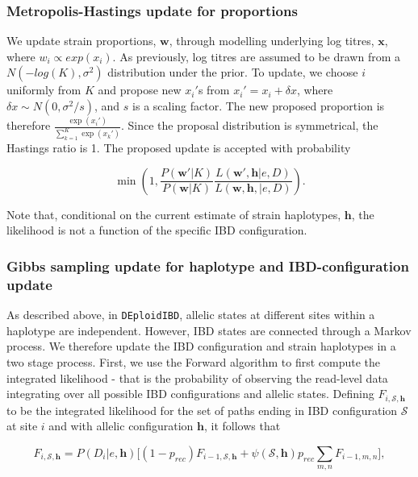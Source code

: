 \documentclass[9pt]{article}
\begin{document}
\subsubsection{Metropolis-Hastings update for proportions}\label{sec:updateP}

We update strain proportions, $\mathbf{w}$, through modelling underlying log titres, $\mathbf{x}$, where $w_i \propto exp(x_i)$.  As previously, log titres are assumed to be drawn from a $N(-log(K), \sigma^2)$ distribution under the prior. To update, we choose $i$ uniformly from $K$ and propose new $x_i'$s from $x_i' = x_i + \delta x$, where $\delta x \sim N(0, \sigma^2/s)$, and $s$ is a scaling factor. The new proposed proportion is therefore $\frac{\exp(x_i')}{\sum_{k=1}^K \exp(x_k')}$. Since the proposal distribution is symmetrical, the Hastings ratio is 1. The proposed update is accepted with probability

 $$\min\left(1, \frac{P(\mathbf{w}'|K)}{P(\mathbf{w}|K)} \frac{L(\mathbf{w}', \mathbf{h} | e, D)}{L(\mathbf{w}, \mathbf{h},  | e, D)}\right).$$

\noindent Note that, conditional on the current estimate of strain haplotypes, $\mathbf{h}$, the likelihood is not a function of the specific IBD configuration.


\subsubsection{Gibbs sampling update for haplotype and IBD-configuration update}

As described above, in {\tt DEploidIBD}, allelic states at different sites within a haplotype are independent. However, IBD states are connected through a Markov process. We therefore update the IBD configuration and strain haplotypes in a two stage process.  First, we use the Forward algorithm to first compute the integrated likelihood - that is the probability of observing the read-level data integrating over all possible IBD configurations and allelic states.  Defining $F_{i,\mathcal{S},\mathbf{h}}$ to be the integrated likelihood for the set of paths ending in IBD configuration $\mathcal{S}$ at site $i$ and with allelic configuration $\mathbf{h}$, it follows that

\begin{equation}
    F_{i,\mathcal{S},\mathbf{h}} = P(D_{i}|e,\mathbf{h}) \big[(1-p_{rec}) F_{i-1,\mathcal{S},\mathbf{h}} +  \psi(\mathcal{S},\mathbf{h}) p_{rec} \sum_{m,n}F_{i-1,m,n}\big],
\end{equation}
\end{document}
